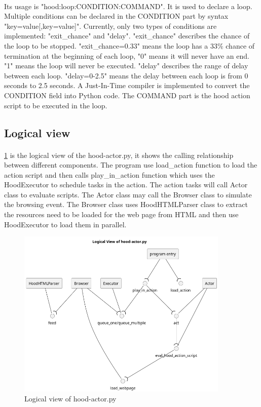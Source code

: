 \documentclass[mscthesis]{usiinfthesis}
\begin{document}
\paragraph{}
Its usage is "hood:loop:CONDITION:COMMAND". It is used to declare a loop. Multiple conditions can be declared in the CONDITION part by syntax "key=value[,key=value]". Currently, only two types of conditions are implemented: "exit\_chance" and "delay". "exit\_chance" describes the chance of the loop to be stopped. "exit\_chance=0.33" means the loop has a 33\% chance of termination at the beginning of each loop, "0" means it will never have an end. "1" means the loop will never be executed. "delay" describes the range of delay between each loop. "delay=0-2.5" means the delay between each loop is from 0 seconds to 2.5 seconds. A Just-In-Time compiler is implemented to convert the CONDITION field into Python code. The COMMAND part is the hood action script to be executed in the loop.

\subsection{Logical view}
\paragraph{}
\cref{fig:actor-logic-view} is the logical view of the hood-actor.py, it shows the calling relationship between different components. The program use load\_action function to load the action script and then calls play\_in\_action function which uses the HoodExecutor to schedule tasks in the action. The action tasks will call Actor class to evaluate scripts. The Actor class may call the Browser class to simulate the browsing event. The Browser class uses HoodHTMLParser class to extract the resources need to be loaded for the web page from HTML and then use HoodExecutor to load them in parallel.
\begin{figure}[H]
  \includegraphics[width=0.9\textwidth]{graphics/puml/actor.png}
  \caption{Logical view of hood-actor.py}
  \label{fig:actor-logic-view}
\end{figure}
\end{document}
